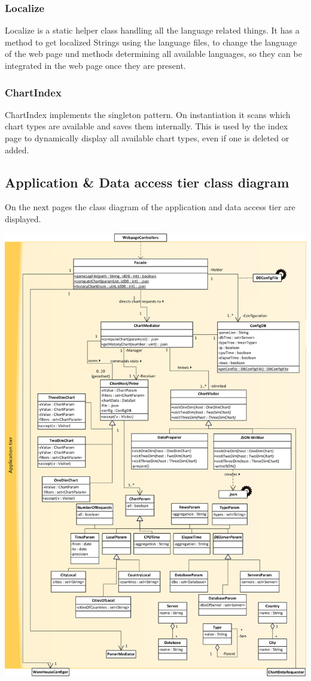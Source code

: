 \subsubsection*{Localize}
Localize is a static helper class handling all the language related things. 
It has a method to get localized Strings using the language files, 
to change the language of the web page und methods determining all available languages, 
so they can be integrated in the web page once they are present.

\subsubsection*{ChartIndex}
ChartIndex implements the singleton pattern. On instantiation it scans which chart types are available 
and saves them internally. This is used by the index page to dynamically display all available chart types,
even if one is deleted or added.


\subsection{Application \& Data access tier class diagram}
On the next pages the class diagram of the application and data access tier are displayed. 
\newpage
\begin{center}
\includegraphics[width=0.9\linewidth]{Pictures/AppTierDia1.png}
\end{center}  

